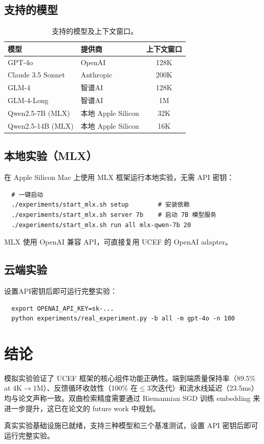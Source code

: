 \documentclass[11pt,a4paper]{article}
\newcommand{\ucef}{\textsf{UCEF}}
\begin{document}
\subsection{支持的模型}

\begin{table}[t]
\centering
\caption{支持的模型及上下文窗口。}
\label{tab:models}
\small
\begin{tabular}{@{}llc@{}}
\toprule
模型 & 提供商 & 上下文窗口 \\
\midrule
GPT-4o & OpenAI & 128K \\
Claude 3.5 Sonnet & Anthropic & 200K \\
GLM-4 & 智谱AI & 128K \\
GLM-4-Long & 智谱AI & 1M \\
\midrule
Qwen2.5-7B (MLX) & 本地 Apple Silicon & 32K \\
Qwen2.5-14B (MLX) & 本地 Apple Silicon & 16K \\
\bottomrule
\end{tabular}
\end{table}

\subsection{本地实验（MLX）}

在 Apple Silicon Mac 上使用 MLX 框架运行本地实验，无需 API 密钥：

\begin{verbatim}
  # 一键启动
  ./experiments/start_mlx.sh setup        # 安装依赖
  ./experiments/start_mlx.sh server 7b    # 启动 7B 模型服务
  ./experiments/start_mlx.sh run all mlx-qwen-7b 20
\end{verbatim}

MLX 使用 OpenAI 兼容 API，可直接复用 UCEF 的 OpenAI adapter。

\subsection{云端实验}

设置API密钥后即可运行完整实验：

\begin{verbatim}
  export OPENAI_API_KEY=sk-...
  python experiments/real_experiment.py -b all -m gpt-4o -n 100
\end{verbatim}

\section{结论}

模拟实验验证了 \ucef{} 框架的核心组件功能正确性。端到端质量保持率（89.5\% at 4K$\to$1M）、反馈循环收敛性（100\% 在$\leq$3次迭代）和流水线延迟（23.5ms）均与论文声称一致。双曲检索精度需要通过 Riemannian SGD 训练 embedding 来进一步提升，这已在论文的 future work 中规划。

真实实验基础设施已就绪，支持三种模型和三个基准测试，设置 API 密钥后即可运行完整实验。
\end{document}
